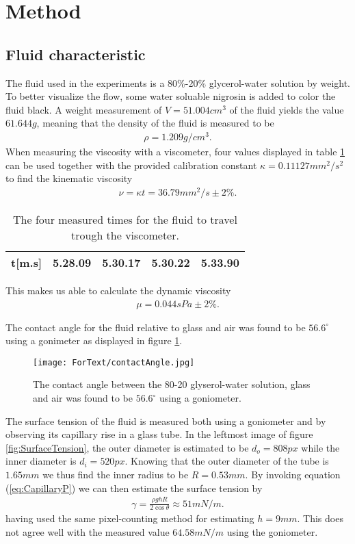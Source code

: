 \documentclass[twoside,utf8]{article}
\newcommand{\EQU}[1] { \begin{equation*} \begin{split} #1 \end{split} \end{equation*} }
\begin{document}
\section{Method}


\subsection{Fluid characteristic}
The fluid used in the experiments is a 80\%-20\% glycerol-water solution by weight. To better visualize the flow, some water soluable nigrosin is added to color the fluid black. A weight measurement of $V=51.004cm^3$ of the fluid yields the value $61.644g$, meaning that the density of the fluid is measured to be
\EQU{
\rho = 1.209 g/cm^3.
}
When measuring the viscosity with a viscometer, four values displayed in table \ref{tab:Viscometer} can be used together with the provided calibration constant $\kappa = 0.11127mm^2/s^2$ to find the kinematic viscosity
\EQU{
\nu = \kappa t = 36.79 mm^2/s \pm 2\%.
}
\begin{table}[H]
	\caption{The four measured times for the fluid to travel trough the viscometer. }
	\centering
	\begin{tabular}{|l|r|r|r|r|}
		\hline
		t[m.s] & 5.28.09 & 5.30.17 & 5.30.22 & 5.33.90 \\
		\hline
	\end{tabular}
	\label{tab:Viscometer}
\end{table}

\noindent
This makes us able to calculate the dynamic viscosity
\EQU{
\mu = 0.044 sPa \pm 2 \%.
}

\noindent
The contact angle for the fluid relative to glass and air was found to be $56.6^\circ$ using a gonimeter as displayed in figure \ref{fig:ContactAngle2}.

\begin{figure}[H]
	\begin{center}
		\texttt{[image: ForText/contactAngle.jpg]}
	\end{center}
	\caption{The contact angle between the 80-20 glyserol-water solution, glass and air was found to be $56.6^\circ$ using a goniometer. }
	\label{fig:ContactAngle2}
\end{figure}

\noindent
The surface tension of the fluid is measured both using a goniometer and by observing its capillary rise in a glass tube. In the leftmost image of figure \ref{fig:SurfaceTension}, the outer diameter is estimated to be $d_o=808px$ while the inner diameter is $d_i=520px$. Knowing that the outer diameter of the tube is $1.65mm$ we thus find the inner radius to be $R=0.53mm$. By invoking equation (\ref{eq:CapillaryP}) we can then estimate the surface tension by
\EQU{
\gamma
= \frac{\rho g h R}{ 2 \cos \theta  }
\approx 51 mN/m.
}
having used the same pixel-counting method for estimating $h=9mm$. This does not agree well with the measured value $64.58mN/m$ using the goniometer.
\end{document}
